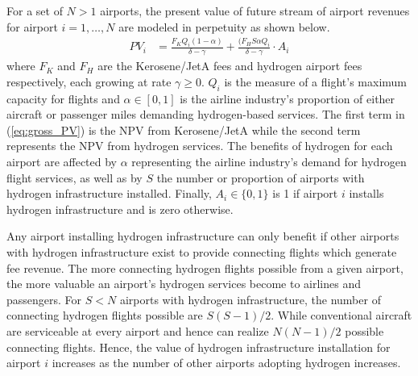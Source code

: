 \documentclass[a4paper, 14pt]{article}
\begin{document}
For a set of $N>1$ airports, the present value of future stream of airport revenues for airport $i=1,\dots, N$ are modeled in perpetuity as shown below.
\begin{align}
    PV_{i} &= \frac{F_K Q_i (1-\alpha)}{\delta - \gamma} + \frac{(F_H S \alpha Q_i}{\delta - \gamma} \cdot A_i \label{eq:gross_PV}
\end{align}
where $F_K$ and $F_H$ are the Kerosene/JetA fees and hydrogen airport fees respectively, each growing at rate $\gamma \geq 0$.
$Q_i$ is the measure of a flight's maximum capacity for flights and $\alpha \in [0,1]$ is the airline industry's proportion of either aircraft or passenger miles demanding hydrogen-based services.
The first term in (\ref{eq:gross_PV}) is the NPV from Kerosene/JetA while the second term represents the NPV from hydrogen services.
The benefits of hydrogen for each airport are affected by $\alpha$ representing the airline industry's demand for hydrogen flight services, as well as by $S$ the number or proportion of airports with hydrogen infrastructure installed.
Finally, $A_i \in \{0,1\}$ is 1 if airport $i$ installs hydrogen infrastructure and is zero otherwise.

Any airport installing hydrogen infrastructure can only benefit if other airports with hydrogen infrastructure exist to provide connecting flights which generate fee revenue.
The more connecting hydrogen flights possible from a given airport, the more valuable an airport's hydrogen services become to airlines and passengers.
For $S < N$ airports with hydrogen infrastructure, the number of connecting hydrogen flights possible are $S(S-1)/2$.
While conventional aircraft are serviceable at every airport and hence can realize $N(N-1)/2$ possible connecting flights.
Hence, the value of hydrogen infrastructure installation for airport $i$ increases as the number of other airports adopting hydrogen increases.
\end{document}
